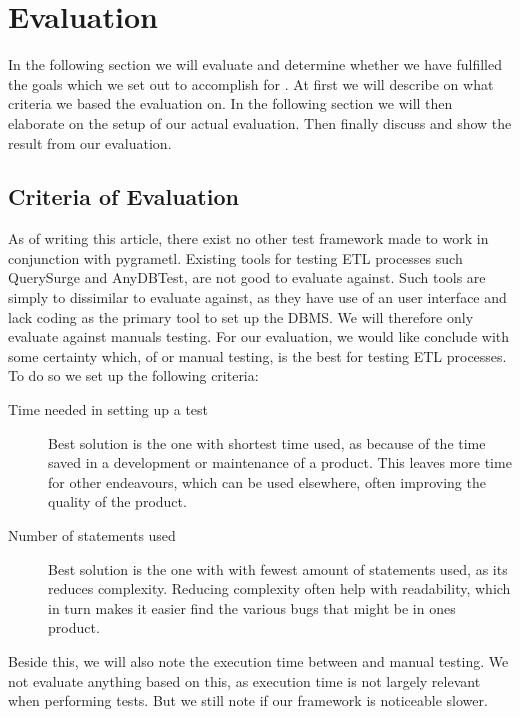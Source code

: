 \section{Evaluation}\label{sect:eval}
In the following section we will evaluate and determine whether we have fulfilled the goals which we set out to accomplish for \FW{}. At first we will describe on what criteria we based the evaluation on. In the following section we will then elaborate on the setup of our actual evaluation. Then finally discuss and show the result from our evaluation.

\subsection{Criteria of Evaluation}\label{subsect:CoE}
As of writing this article, there exist no other test framework made to work in conjunction with pygrametl. Existing tools for testing ETL processes such QuerySurge and AnyDBTest, are not good to evaluate against. Such tools are simply to dissimilar to evaluate against, as they have use of an user interface and lack coding as the primary tool to set up the DBMS. We will therefore only evaluate \FW{} against manuals testing. For our evaluation, we would like conclude with some certainty which, of \FW{} or manual testing, is the best for testing ETL processes. To do so we set up the following criteria:

\begin{description}
\item[Time needed in setting up a test] Best solution is the one with shortest time used, as because of the time saved in a development or maintenance of a product. This leaves more time for other endeavours, which can be used elsewhere, often improving the quality of the product.
\item[Number of statements used] Best solution is the one with with fewest amount of statements used, as its reduces complexity. Reducing complexity often help with readability, which in turn makes it easier find the various bugs that might be in ones product.
\end{description}

Beside this, we will also note the execution time between \FW{} and manual testing. We not evaluate anything based on this, as execution time is not largely relevant when performing tests. But we still note if our framework is noticeable slower.

